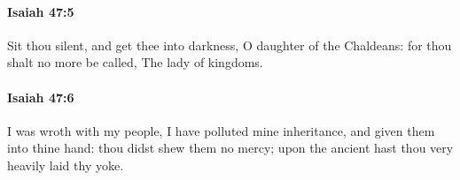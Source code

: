 		\paragraph{Isaiah 47:5} %
			\label{ISAIAH-47-5}

			Sit thou silent, and get thee into darkness, O daughter of the Chaldeans: for thou shalt no more be called, The lady of kingdoms.


		\paragraph{Isaiah 47:6} %
			\label{ISAIAH-47-6}

			I was wroth with my people, I have polluted mine inheritance, and given them into thine hand: thou didst shew them no mercy; upon the ancient hast thou very heavily laid thy yoke.


